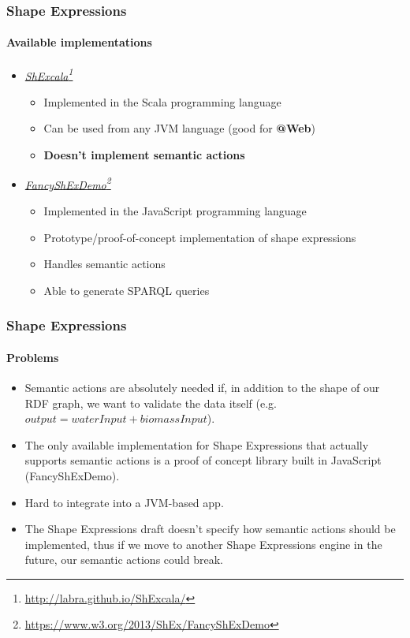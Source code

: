 \documentclass{beamer}
\makeatletter
\newcommand{\atweb}{\textbf{@Web}\xspace}
\newcommand{\fnhref}[2]{\href{#2}{#1}\footnote{\url{#2}}}
\newcommand{\ifnhref}[2]{\textit{\fnhref{#1}{#2}}}
\makeatother
\begin{document}
\begin{frame}
  \frametitle{Shape Expressions}
  \framesubtitle{Available implementations}

  \begin{itemize}
    \item \ifnhref{ShExcala}{http://labra.github.io/ShExcala/}

    \begin{itemize}
      \item Implemented in the Scala programming language

      \item Can be used from any JVM language (good for \atweb)

      \item \textbf{Doesn't implement semantic actions}
    \end{itemize}

    \item \ifnhref{FancyShExDemo}{https://www.w3.org/2013/ShEx/FancyShExDemo}

    \begin{itemize}
      \item Implemented in the JavaScript programming language

      \item Prototype/proof-of-concept implementation of shape expressions

      \item Handles semantic actions

      \item Able to generate SPARQL queries
    \end{itemize}
  \end{itemize}
\end{frame}

\begin{frame}
  \frametitle{Shape Expressions}
  \framesubtitle{Problems}

  \begin{itemize}
    \item Semantic actions are absolutely needed if, in addition to the shape
      of our RDF graph, we want to validate the data itself (e.g. $output =
      waterInput + biomassInput$).

    \item The only available implementation for Shape Expressions that actually
      supports semantic actions is a proof of concept library built in
      JavaScript (FancyShExDemo).

    \item Hard to integrate into a JVM-based app.

    \item The Shape Expressions draft doesn't specify how semantic actions
      should be implemented, thus if we move to another Shape Expressions
      engine in the future, our semantic actions could break.
  \end{itemize}
\end{frame}
\end{document}
